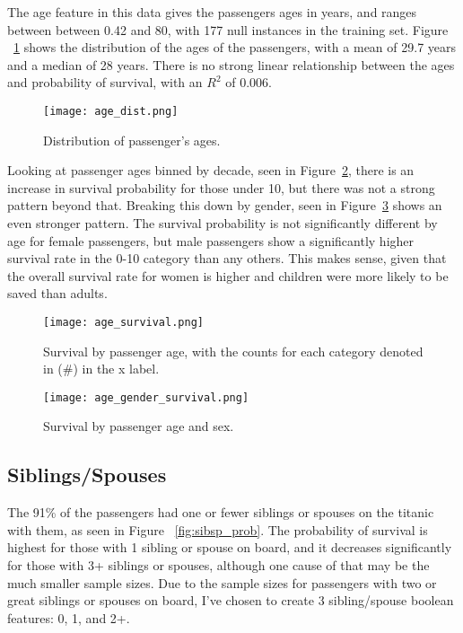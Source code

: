 \documentclass[12pt, letterpaper]{article}
\begin{document}
The age feature in this data gives the passengers ages in years, and ranges between between 0.42 and 80, with 177 null instances in the training set. Figure ~\ref{fig:age_dist} shows the distribution of the ages of the passengers, with a mean of 29.7 years and a median of 28 years. There is no strong linear relationship between the ages and probability of survival, with an \(R^2\) of 0.006. 

\begin{figure}[H]
    \centering
    \texttt{[image: age\_dist.png]}
    \caption{Distribution of passenger's ages.}
    \label{fig:age_dist}
\end{figure}

Looking at passenger ages binned by decade, seen in Figure~\ref{fig:age_prob}, there is an increase in survival probability for those under 10, but there was not a strong pattern beyond that. Breaking this down by gender, seen in Figure~\ref{fig:age_gender_prob} shows an even stronger pattern. The survival probability is not significantly different by age for female passengers, but male passengers show a significantly higher survival rate in the 0-10 category than any others. This makes sense, given that the overall survival rate for women is higher and children were more likely to be saved than adults. 

\begin{figure}[H]
    \centering
    \texttt{[image: age\_survival.png]}
    \caption{Survival by passenger age, with the counts for each category denoted in (\#) in the x label. }
    \label{fig:age_prob}
\end{figure}


\begin{figure}[H]
    \centering
    \texttt{[image: age\_gender\_survival.png]}
    \caption{Survival by passenger age and sex.}
    \label{fig:age_gender_prob}
\end{figure}


\subsection{Siblings/Spouses}

The 91\% of the passengers had one or fewer siblings or spouses on the titanic with them, as seen in Figure ~\ref{fig:sibsp_prob}. The probability of survival is highest for those with 1 sibling or spouse on board, and it decreases significantly for those with 3+ siblings or spouses, although one cause of that may be the much smaller sample sizes. Due to the sample sizes for passengers with two or great siblings or spouses on board, I've chosen to create 3 sibling/spouse boolean features: 0, 1, and 2+.  
\end{document}
